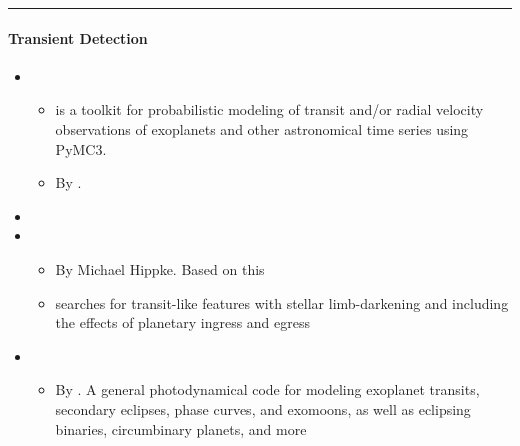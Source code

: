 \documentclass[letterpaper,10pt,english]{sphinxmanual}
\begin{document}
\bigskip\hrule\bigskip



\paragraph{Transient Detection}
\label{\detokenize{resource/astro/topics/exoplanet:transient-detection}}\begin{itemize}
\item {} 
\begin{itemize}
\item {} 
 is a toolkit for probabilistic modeling of transit
and/or radial velocity observations of exoplanets and other
astronomical time series using PyMC3.

\item {} 
By .

\end{itemize}

\item {} 

\item {} 
\begin{itemize}
\item {} 
By Michael Hippke. Based on this

\item {} 
 searches for transit-like features with stellar
limb-darkening and including the effects of planetary ingress and
egress

\end{itemize}

\item {} 
\begin{itemize}
\item {} 
By . A general
photodynamical code for modeling exoplanet transits, secondary
eclipses, phase curves, and exomoons, as well as eclipsing
binaries, circumbinary planets, and more


\end{itemize}
\end{itemize}
\end{document}
